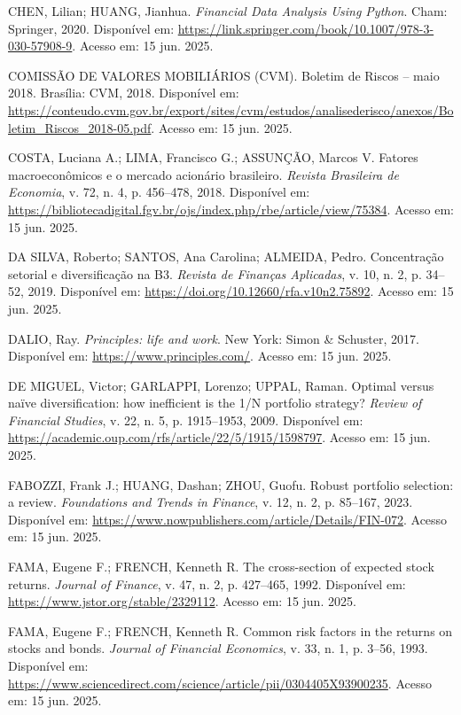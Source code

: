 \noindent
CHEN, Lilian; HUANG, Jianhua. \textit{Financial Data Analysis Using Python}. Cham: Springer, 2020. Disponível em: \url{https://link.springer.com/book/10.1007/978-3-030-57908-9}. Acesso em: 15 jun. 2025.

\noindent
COMISSÃO DE VALORES MOBILIÁRIOS (CVM). Boletim de Riscos -- maio 2018. Brasília: CVM, 2018. Disponível em: \url{https://conteudo.cvm.gov.br/export/sites/cvm/estudos/analisederisco/anexos/Boletim_Riscos_2018-05.pdf}. Acesso em: 15 jun. 2025.

\noindent
COSTA, Luciana A.; LIMA, Francisco G.; ASSUNÇÃO, Marcos V. Fatores macroeconômicos e o mercado acionário brasileiro. \textit{Revista Brasileira de Economia}, v. 72, n. 4, p. 456--478, 2018. Disponível em: \url{https://bibliotecadigital.fgv.br/ojs/index.php/rbe/article/view/75384}. Acesso em: 15 jun. 2025.

\noindent
DA SILVA, Roberto; SANTOS, Ana Carolina; ALMEIDA, Pedro. Concentração setorial e diversificação na B3. \textit{Revista de Finanças Aplicadas}, v. 10, n. 2, p. 34--52, 2019. Disponível em: \url{https://doi.org/10.12660/rfa.v10n2.75892}. Acesso em: 15 jun. 2025.

\noindent
DALIO, Ray. \textit{Principles: life and work}. New York: Simon \& Schuster, 2017. Disponível em: \url{https://www.principles.com/}. Acesso em: 15 jun. 2025.

\noindent
DE MIGUEL, Victor; GARLAPPI, Lorenzo; UPPAL, Raman. Optimal versus naïve diversification: how inefficient is the 1/N portfolio strategy? \textit{Review of Financial Studies}, v. 22, n. 5, p. 1915--1953, 2009. Disponível em: \url{https://academic.oup.com/rfs/article/22/5/1915/1598797}. Acesso em: 15 jun. 2025.

\noindent
FABOZZI, Frank J.; HUANG, Dashan; ZHOU, Guofu. Robust portfolio selection: a review. \textit{Foundations and Trends in Finance}, v. 12, n. 2, p. 85--167, 2023. Disponível em: \url{https://www.nowpublishers.com/article/Details/FIN-072}. Acesso em: 15 jun. 2025.

\noindent
FAMA, Eugene F.; FRENCH, Kenneth R. The cross-section of expected stock returns. \textit{Journal of Finance}, v. 47, n. 2, p. 427--465, 1992. Disponível em: \url{https://www.jstor.org/stable/2329112}. Acesso em: 15 jun. 2025.

\noindent
FAMA, Eugene F.; FRENCH, Kenneth R. Common risk factors in the returns on stocks and bonds. \textit{Journal of Financial Economics}, v. 33, n. 1, p. 3--56, 1993. Disponível em: \url{https://www.sciencedirect.com/science/article/pii/0304405X93900235}. Acesso em: 15 jun. 2025.

